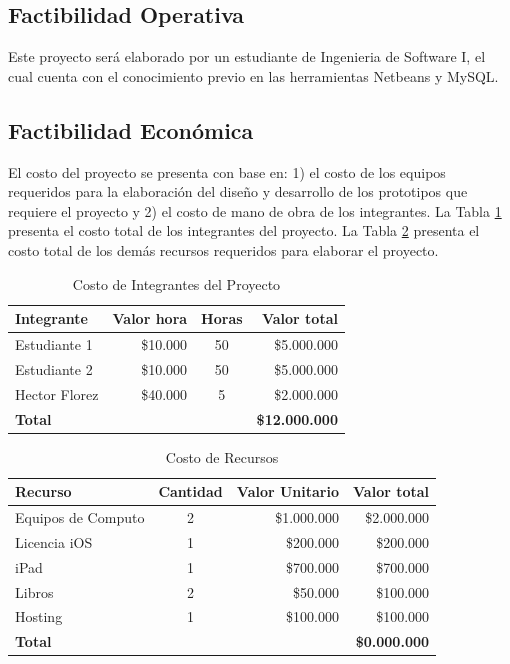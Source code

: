 \subsection{Factibilidad Operativa}

Este proyecto será elaborado por un estudiante de Ingenieria de Software I, el cual cuenta con el conocimiento previo en las herramientas Netbeans y MySQL.


\subsection{Factibilidad Económica}
El costo del proyecto se presenta con base en: 1) el costo de los equipos requeridos para la elaboración del diseño y desarrollo de los prototipos que requiere el proyecto y 2) el costo de mano de obra de los integrantes. La Tabla \ref{table:Costo-de-Integrantes-del-Proyecto} presenta el costo total de los integrantes del proyecto. La Tabla \ref{table:Costo-de-Recursos} presenta el costo total de los demás recursos requeridos para elaborar el proyecto.   

\begin{table}[ht]
\centering
\caption{Costo de Integrantes del Proyecto}
\label{table:Costo-de-Integrantes-del-Proyecto}
\begin{tabular}{l r c r} \hline
\textbf{Integrante}&\textbf{Valor hora}&\textbf{Horas}&\textbf{Valor total} \\ \hline
Estudiante 1 & \$10.000 & 50 & \$5.000.000 \\ \hline
Estudiante 2 & \$10.000 & 50 & \$5.000.000 \\ \hline
Hector Florez & \$40.000 & 5 & \$2.000.000 \\ \hline \hline
\textbf{Total} & & & \textbf{\$12.000.000} \\ \hline
\end{tabular}
\end{table}

\begin{table}[ht]
\centering
\caption{Costo de Recursos}
\label{table:Costo-de-Recursos}
\begin{tabular}{l c r r} \hline
\textbf{Recurso}&\textbf{Cantidad}&\textbf{Valor Unitario}&\textbf{Valor total} \\ \hline
Equipos de Computo & 2 & \$1.000.000 & \$2.000.000 \\ \hline
Licencia iOS & 1 & \$200.000 & \$200.000 \\ \hline
iPad & 1 & \$700.000 & \$700.000 \\ \hline
Libros & 2 & \$50.000 & \$100.000 \\ \hline
Hosting & 1 & \$100.000 & \$100.000 \\ \hline \hline
\textbf{Total} & & & \textbf{\$0.000.000} \\ \hline
\end{tabular}
\end{table}

